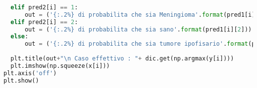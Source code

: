 \begin{lstlisting}[basicstyle=\tiny, language=Python, caption=Esempio di implementazione di AlexNet per la classificazione di RM con l'aggiunta di rumore al set di training.~\cite{dsbrain} ]
      
  elif pred2[i] == 1:
      out = ('{:.2%} di probabilita che sia Meningioma'.format(pred1[i][1]))
  elif pred2[i] == 2:
      out = ('{:.2%} di probabilita che sia sano'.format(pred1[i][2]))
  else: 
      out = ('{:.2%} di probabilita che sia tumore ipofisario'.format(pred1[i][3]))
  
  plt.title(out+"\n Caso effettivo : "+ dic.get(np.argmax(y[i])))    
  plt.imshow(np.squeeze(x[i]))
plt.axis('off')
plt.show()
\end{lstlisting}